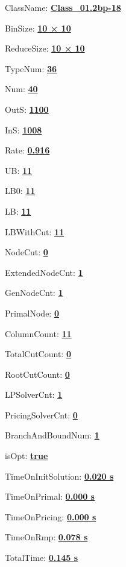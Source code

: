 \documentclass[11pt]{article}
\begin{document}
\pagestyle{empty}


ClassName: \underline{\textbf{Class_01.2bp-18}}
\par
BinSize: \underline{\textbf{10 × 10}}
\par
ReduceSize: \underline{\textbf{10 × 10}}
\par
TypeNum: \underline{\textbf{36}}
\par
Num: \underline{\textbf{40}}
\par
OutS: \underline{\textbf{1100}}
\par
InS: \underline{\textbf{1008}}
\par
Rate: \underline{\textbf{0.916}}
\par
UB: \underline{\textbf{11}}
\par
LB0: \underline{\textbf{11}}
\par
LB: \underline{\textbf{11}}
\par
LBWithCut: \underline{\textbf{11}}
\par
NodeCut: \underline{\textbf{0}}
\par
ExtendedNodeCnt: \underline{\textbf{1}}
\par
GenNodeCnt: \underline{\textbf{1}}
\par
PrimalNode: \underline{\textbf{0}}
\par
ColumnCount: \underline{\textbf{11}}
\par
TotalCutCount: \underline{\textbf{0}}
\par
RootCutCount: \underline{\textbf{0}}
\par
LPSolverCnt: \underline{\textbf{1}}
\par
PricingSolverCnt: \underline{\textbf{0}}
\par
BranchAndBoundNum: \underline{\textbf{1}}
\par
isOpt: \underline{\textbf{true}}
\par
TimeOnInitSolution: \underline{\textbf{0.020 s}}
\par
TimeOnPrimal: \underline{\textbf{0.000 s}}
\par
TimeOnPricing: \underline{\textbf{0.000 s}}
\par
TimeOnRmp: \underline{\textbf{0.078 s}}
\par
TotalTime: \underline{\textbf{0.145 s}}
\par
\newpage


\end{document}
